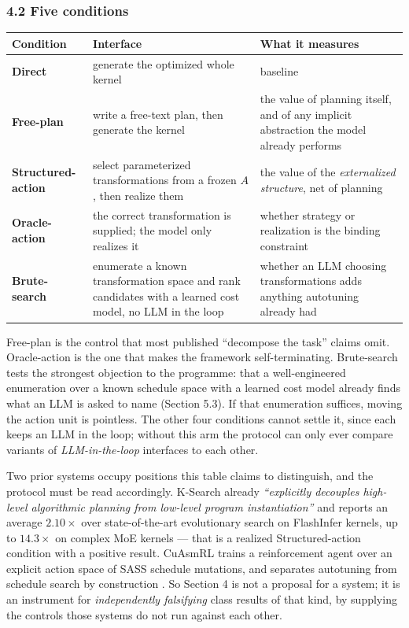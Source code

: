 \documentclass[
  11pt,
]{article}
\begin{document}
\hypertarget{five-conditions}{%
\subsubsection{4.2 Five conditions}\label{five-conditions}}

\begin{longtable}[]{@{}
  >{\raggedright\arraybackslash}p{}
  >{\raggedright\arraybackslash}p{}
  >{\raggedright\arraybackslash}p{}@{}}
\toprule
Condition & Interface & What it measures \\
\midrule
\endhead
\textbf{Direct} & generate the optimized whole kernel & baseline \\
\textbf{Free-plan} & write a free-text plan, then generate the kernel & the value of planning itself, and of any implicit abstraction the model already performs \\
\textbf{Structured-action} & select parameterized transformations from a frozen \(A\), then realize them & the value of the \emph{externalized structure}, net of planning \\
\textbf{Oracle-action} & the correct transformation is supplied; the model only realizes it & whether strategy or realization is the binding constraint \\
\textbf{Brute-search} & enumerate a known transformation space and rank candidates with a learned cost model, no LLM in the loop & whether an LLM choosing transformations adds anything autotuning already had \\
\bottomrule
\end{longtable}

Free-plan is the control that most published ``decompose the task'' claims omit. Oracle-action is the one that makes the framework self-terminating. Brute-search tests the strongest objection to the programme: that a well-engineered enumeration over a known schedule space with a learned cost model already finds what an LLM is asked to name (Section 5.3). If that enumeration suffices, moving the action unit is pointless. The other four conditions cannot settle it, since each keeps an LLM in the loop; without this arm the protocol can only ever compare variants of \emph{LLM-in-the-loop} interfaces to each other.

Two prior systems occupy positions this table claims to distinguish, and the protocol must be read accordingly. K-Search already \emph{``explicitly decouples high-level algorithmic planning from low-level program instantiation''} and reports an average \(2.10\times\) over state-of-the-art evolutionary search on FlashInfer kernels, up to \(14.3\times\) on complex MoE kernels \cite{ksearch29} --- that is a realized Structured-action condition with a positive result. CuAsmRL trains a reinforcement agent over an explicit action space of SASS schedule mutations, and separates autotuning from schedule search by construction \cite{cuasmrl30}. So Section 4 is not a proposal for a system; it is an instrument for \emph{independently falsifying} class results of that kind, by supplying the controls those systems do not run against each other.
\end{document}
